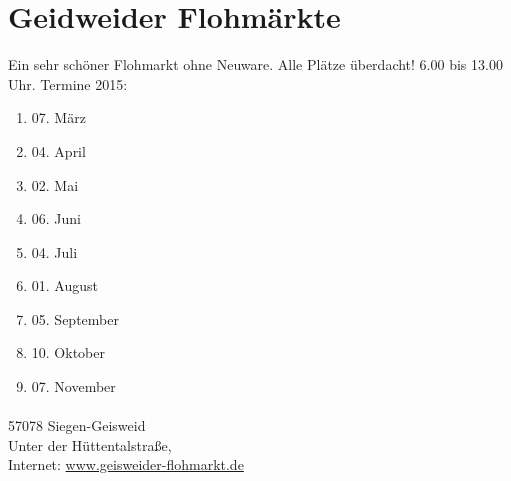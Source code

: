 
\section{Geidweider Flohmärkte}
Ein sehr schöner Flohmarkt ohne Neuware. Alle Plätze überdacht! 6.00 bis 13.00 Uhr. Termine 2015:\\
\begin{enumerate}
	\item 07. März
	\item 04. April
	\item 02. Mai
	\item 06. Juni
	\item 04. Juli 
	\item 01. August
	\item 05. September
	\item 10. Oktober
	\item 07. November
\end{enumerate}

\paragraph{}57078 Siegen-Geisweid\\
Unter der Hüttentalstraße,\\
Internet: \href{http://www.geisweider-flohmarkt.de}{www.geisweider-flohmarkt.de}